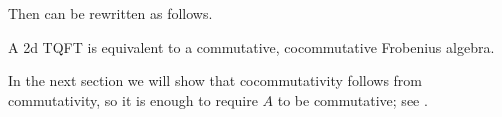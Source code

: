 Then  can be rewritten as follows.
\begin{theorem}\label{t:2d-classification2}
  A 2d TQFT is equivalent to a commutative, cocommutative Frobenius algebra.
\end{theorem}
In the next section we will show that cocommutativity follows from
commutativity, so it is enough to require $A$ to be commutative; see
.


\clearpage
